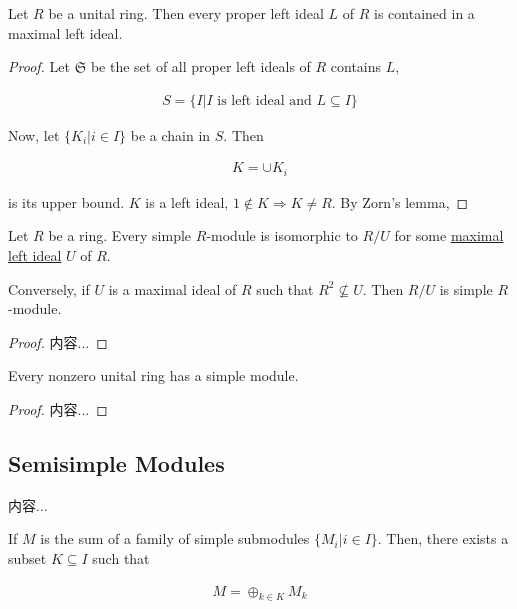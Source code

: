\documentclass[Total.tex]{subfiles}
\begin{document}
	\begin{lemma}
		Let $R$ be a unital ring. Then every proper left ideal $L$ of $R$ is contained in a maximal left ideal. 
	\end{lemma}
	
	\begin{proof}
		Let $\mathfrak{S}$ be the set of all proper left ideals of $R$ contains $L$,
		
		\begin{gather*}
			S=\{I|I\mbox{ is left ideal and }L\subseteq I\}
		\end{gather*}
		
		Now, let $\{K_i|i\in I\}$ be a chain in $S$. Then
		
		\begin{gather*}
			K=\cup K_i
		\end{gather*}
		
		is its upper bound. $K$ is a left ideal, $1\notin K\Rightarrow K\not=R$. By Zorn's lemma,
	\end{proof}
	
	\begin{lemma}
		Let $R$ be a ring. Every simple $R$-module is isomorphic to $R/U$ for some \underline{maximal left ideal} $U$ of $R$.
		
		Conversely, if $U$ is a maximal ideal of $R$ such that $R^2\not\subseteq U$. Then $R/U$ is simple $R$-module. 
	\end{lemma}
	
	\begin{proof}
		内容...
	\end{proof}
	
	\begin{corollary}
		Every nonzero unital ring has a simple module. 
	\end{corollary}
	
	\begin{proof}
		内容...
	\end{proof}
	
	\subsection{Semisimple Modules}
	
	\begin{example}
		内容...
	\end{example}
	
	\begin{lemma}
		If $M$ is the sum of a family of simple submodules $\{M_i|i\in I\}$. Then, there exists a subset $K\subseteq I$ such that
		
		\begin{gather*}
			M=\oplus_{k\in K} M_k
		\end{gather*}
	\end{lemma}
	
\end{document}
